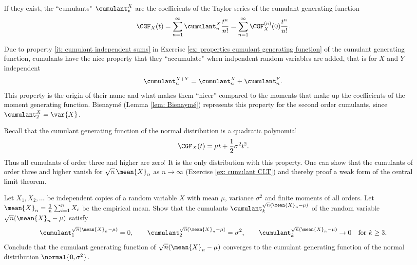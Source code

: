 \begin{definition}[Cumulants]
    If they exist, the ``cumulants'' \(\cumulant_n^X\) are the coefficients of the Taylor
    series of the cumulant generating function
    \[
        \CGF_X(t)
        = \sum_{n=1}^\infty \cumulant_n^X \frac{t^n}{n!}
        = \sum_{n=1}^\infty \CGF_X^{(n)}(0) \frac{t^n}{n!}.
    \]
\end{definition}

Due to property \ref{it: cumulant independent sums} in Exercise \ref{ex:
properties cumulant generating function} of the cumulant generating function,
cumulants have the nice property that they ``accumulate'' when indpendent
random variables are added, that is for \(X\) and \(Y\) independent
\[
    \cumulant_n^{X+Y} = \cumulant_n^X + \cumulant_n^Y.
\]
This property is the origin of their name and what makes them ``nicer'' compared
to the moments that make up the coefficients of the moment generating function.
Bienaymé (Lemma \ref{lem: Bienaymé}) represents this property for the second
order cumulants, since \(\cumulant_2^X = \var{X}\).

\begin{remark}
    Recall that the cumulant generating function of the 
    normal distribution is a quadratic polynomial
    \[
        \CGF_X(t) = \mu t + \frac12 \sigma^2 t^2.
    \]
    Thus all cumulants of order three and higher are zero! It is the only
    distribution with this property. One can show that the cumulants of order
    three and higher vanish for \(\sqrt{n}\, \mean{X}_n\) as \(n\to\infty\)
    (Exercise \ref{ex: cumulant CLT}) and thereby proof a weak form of the
    central limit theorem.
\end{remark}
\begin{exercise}
    \label{ex: cumulant CLT}
    Let \(X_1, X_2, \ldots\) be independent copies of a random variable
    \(X\) with mean \(\mu\), variance \(\sigma^2\) and finite moments of all orders.
    Let \(\mean{X}_n = \frac1n \sum_{i=1}^n X_i\) be the empirical mean.
    Show that the cumulants \(\cumulant_k^{\sqrt{n}(\mean{X}_n - \mu)}\)
    of the random variable \(\sqrt{n}(\mean{X}_n - \mu)\) satisfy
    \[
        \cumulant_1^{\sqrt{n}(\mean{X}_n - \mu)} = 0,
        \qquad
        \cumulant_2^{\sqrt{n}(\mean{X}_n - \mu)} = \sigma^2,
        \qquad
        \cumulant_k^{\sqrt{n}(\mean{X}_n - \mu)} \to 0
        \quad\text{for } k \ge 3.
    \]
    Conclude that the cumulant generating function of
    \(\sqrt{n}(\mean{X}_n - \mu)\) converges to the cumulant generating function
    of the normal distribution \(\normal{0, \sigma^2}\).
\end{exercise}

